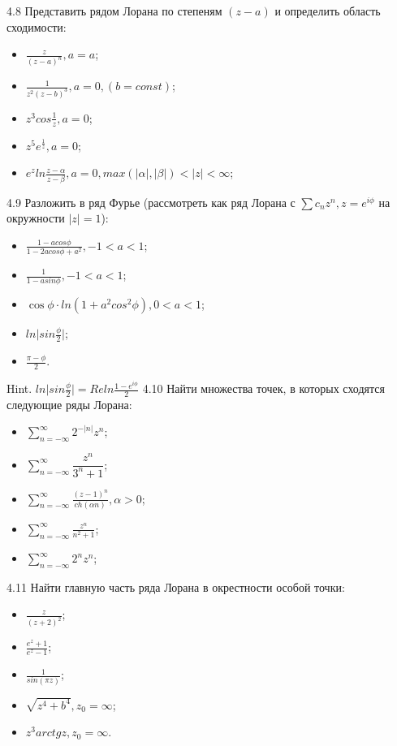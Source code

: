 \documentclass{article}
\begin{document}
4.8 Представить рядом Лорана по степеням $(z-a)$ и определить область сходимости:
\begin{itemize}
\item $\frac{z}{(z-a)^n}, a=a$;
\item $\frac{1}{z^2(z-b)^3}, a=0, (b=const)$;
\item $z^3cos\frac{1}{z},a=0$;
\item $z^5e^\frac{1}{z},a=0$;
\item $e^zln\frac{z-\alpha}{z-\beta}, a=0, max(\vert\alpha\vert, \vert \beta \vert) < \vert z\vert < \infty$;
\end{itemize}

4.9 Разложить в ряд Фурье (рассмотреть как ряд Лорана с $\sum c_nz^n, z=e^{i\phi}$ на окружности $\vert z\vert=1$):
\begin{itemize}
\item $\frac{1-acos\phi}{1-2acos\phi+a^2}, -1<a<1$;
\item $\frac{1}{1-asin\phi}, -1<a<1$;
\item $\cos\phi\cdot ln(1+a^2cos^2\phi), 0<a<1$;
\item $ln\vert sin \frac{\phi}{2} \vert$;
\item $\frac{\pi-\phi}{2}$.
\end{itemize}

Hint. $ln\vert sin \frac{\phi}{2} \vert = Re{ln\frac{1-e^{i\phi}}{2}}$
4.10 Найти множества точек, в которых сходятся следующие ряды Лорана:
\begin{itemize}
\item $\sum_{n=-\infty}^{\infty}2^{-\vert n\vert}z^n$;
\item $\sum_{n=-\infty}^{\infty}\dfrac{z^n}{3^n+1}$;
\item $\sum_{n=-\infty}^{\infty}\frac{(z-1)^n}{ch(\alpha n)}, \alpha > 0$;
\item $\sum_{n=-\infty}^{\infty}\frac{z^n}{n^2+1}$;
\item $\sum_{n=-\infty}^{\infty}2^nz^n$;
\end{itemize}

4.11 Найти главную часть ряда Лорана в окрестности особой точки:
\begin{itemize}
\item $\frac{z}{(z+2)^2}$;
\item $\frac{e^z+1}{e^z-1}$;
\item $\frac{1}{sin(\pi z)}$;
\item $\sqrt{z^4+b^4}, z_0=\infty$;
\item $z^3 arctgz, z_0=\infty$.
\end{itemize}
\end{document}
